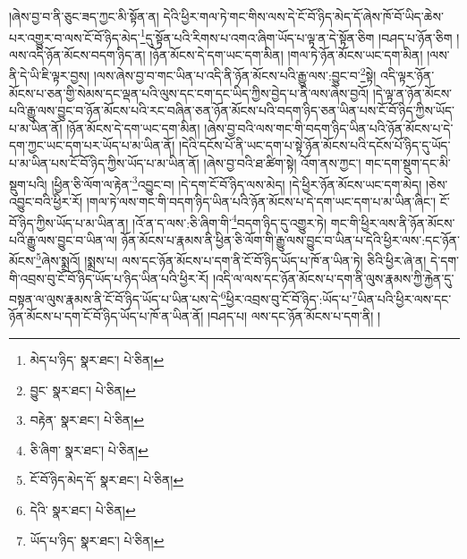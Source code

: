།ཞེས་བྱ་བ་ནི་ཅུང་ཟད་ཀྱང་མི་སྟོན་ན། དེའི་ཕྱིར་གལ་ཏེ་གང་གིས་ལས་དེ་ངོ་བོ་ཉིད་མེད་དོ་ཞེས་ཁོ་བོ་ཡིད་ཆེས་པར་འགྱུར་བ་ལས་ངོ་བོ་ཉིད་མེད་\footnote{མེད་པ་ཉིད་  སྣར་ཐང་།  པེ་ཅིན། }དུ་སྟོན་པའི་རིགས་པ་འགའ་ཞིག་ཡོད་པ་ལྟ་ན་དེ་སྟོན་ཅིག །བཤད་པ་ཉོན་ཅིག །ལས་འདི་ཉོན་མོངས་བདག་ཉིད་ན། །ཉོན་མོངས་དེ་དག་ཡང་དག་མིན། །གལ་ཏེ་ཉོན་མོངས་ཡང་དག་མིན། །ལས་ནི་དེ་ཡི་ཇི་ལྟར་བྱས། །ལས་ཞེས་བྱ་བ་གང་ཡིན་པ་འདི་ནི་ཉོན་མོངས་པའི་རྒྱུ་ལས་:བྱུང་བ་\footnote{བྱུང་  སྣར་ཐང་།  པེ་ཅིན། }སྟེ། འདི་ལྟར་ཉོན་མོངས་པ་ཅན་གྱི་སེམས་དང་ལྡན་པའི་ལུས་དང་ངག་དང་ཡིད་ཀྱིས་བྱེད་པ་ནི་ལས་ཞེས་བྱའོ། །དེ་ལྟ་ན་ཉོན་མོངས་པའི་རྒྱུ་ལས་བྱུང་བ་ཉོན་མོངས་པའི་རང་བཞིན་ཅན་ཉོན་མོངས་པའི་བདག་ཉིད་ཅན་ཡིན་པས་ངོ་བོ་ཉིད་ཀྱིས་ཡོད་པ་མ་ཡིན་ནོ། །ཉོན་མོངས་དེ་དག་ཡང་དག་མིན། །ཞེས་བྱ་བའི་ལས་གང་གི་བདག་ཉིད་ཡིན་པའི་ཉོན་མོངས་པ་དེ་དག་ཀྱང་ཡང་དག་པར་ཡོད་པ་མ་ཡིན་ནོ། །དེའི་དངོས་པོ་ནི་ཡང་དག་པ་སྟེ་ཉོན་མོངས་པའི་དངོས་པོ་ཉིད་དུ་ཡོད་པ་མ་ཡིན་པས་ངོ་བོ་ཉིད་ཀྱིས་ཡོད་པ་མ་ཡིན་ནོ། །ཞེས་བྱ་བའི་ཐ་ཚིག་སྟེ། འོག་ནས་ཀྱང་། གང་དག་སྡུག་དང་མི་སྡུག་པའི། །ཕྱིན་ཅི་ལོག་ལ་རྟེན་\footnote{བརྟེན་  སྣར་ཐང་།  པེ་ཅིན། }འབྱུང་བ། །དེ་དག་ངོ་བོ་ཉིད་ལས་མེད། །དེ་ཕྱིར་ཉོན་མོངས་ཡང་དག་མེད། །ཅེས་འབྱུང་བའི་ཕྱིར་རོ། །གལ་ཏེ་ལས་གང་གི་བདག་ཉིད་ཡིན་པའི་ཉོན་མོངས་པ་དེ་དག་ཡང་དག་པ་མ་ཡིན་ཞིང་། ངོ་བོ་ཉིད་ཀྱིས་ཡོད་པ་མ་ཡིན་ན། །འོ་ན་ད་ལས་:ཅི་ཞིག་གི་\footnote{ཅི་ཞིག་  སྣར་ཐང་།  པེ་ཅིན། }བདག་ཉིད་དུ་འགྱུར་ཏེ། གང་གི་ཕྱིར་ལས་ནི་ཉོན་མོངས་པའི་རྒྱུ་ལས་བྱུང་བ་ཡིན་ལ། ཉོན་མོངས་པ་རྣམས་ནི་ཕྱིན་ཅི་ལོག་གི་རྒྱུ་ལས་བྱུང་བ་ཡིན་པ་དེའི་ཕྱིར་ལས་:དང་ཉོན་མོངས་\footnote{ངོ་བོ་ཉིད་མེད་དོ་  སྣར་ཐང་།  པེ་ཅིན། }ཞེས་སྨྲའོ། །སྨྲས་པ། ལས་དང་ཉོན་མོངས་པ་དག་ནི་ངོ་བོ་ཉིད་ཡོད་པ་ཁོ་ན་ཡིན་ཏེ། ཅིའི་ཕྱིར་ཞེ་ན། དེ་དག་གི་འབྲས་བུ་ངོ་བོ་ཉིད་ཡོད་པ་ཉིད་ཡིན་པའི་ཕྱིར་རོ། །འདི་ལ་ལས་དང་ཉོན་མོངས་པ་དག་ནི་ལུས་རྣམས་ཀྱི་རྐྱེན་དུ་བསྟན་ལ་ལུས་རྣམས་ནི་ངོ་བོ་ཉིད་ཡོད་པ་ཡིན་པས་དེ་\footnote{དེའི་  སྣར་ཐང་།  པེ་ཅིན། }ཕྱིར་འབྲས་བུ་ངོ་བོ་ཉིད་:ཡོད་པ་\footnote{ཡོད་པ་ཉིད་  སྣར་ཐང་།  པེ་ཅིན། }ཡིན་པའི་ཕྱིར་ལས་དང་ཉོན་མོངས་པ་དག་ངོ་བོ་ཉིད་ཡོད་པ་ཁོ་ན་ཡིན་ནོ། །བཤད་པ། ལས་དང་ཉོན་མོངས་པ་དག་ནི། །
